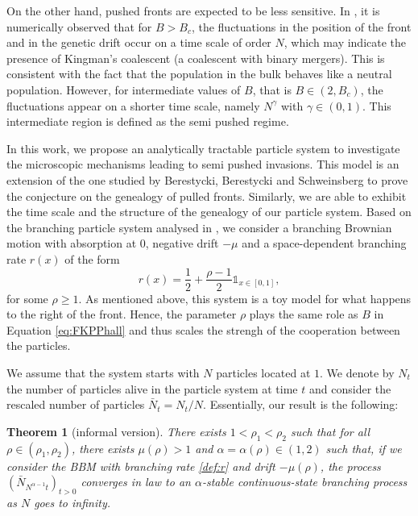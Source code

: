 \documentclass[11pt]{article}
\theoremstyle{plain}
\newtheorem{theorem}[lemma]{Theorem}
\begin{document}
  On the other hand, pushed fronts are expected to be less sensitive. In \cite{Birzu2018}, it is numerically observed that for $B>B_c$, the fluctuations in the position of the front and in the genetic drift occur on a time scale of order $N$, which may indicate the presence of Kingman's coalescent (a coalescent with binary mergers). This is consistent with the fact that the population in the bulk behaves like a neutral population. However, for intermediate values of $B$, that is $B\in(2,B_c)$, the fluctuations appear on a shorter time scale, namely $N^\gamma$ with $\gamma\in(0,1)$.  This intermediate region is defined as the semi pushed regime.

  
In this work, we propose an analytically tractable particle system to investigate the microscopic mechanisms leading to semi pushed invasions. This model is an extension of the one studied by Berestycki, Berestycki and Schweinsberg \cite{Berestycki2010} to prove the conjecture on the genealogy of pulled fronts. Similarly, we are able to exhibit the time scale and the structure of the genealogy of our particle system. Based on the branching particle system analysed in \cite{Berestycki2010}, we consider a branching Brownian motion with absorption at $0$, negative drift $-\mu$ and a space-dependent branching rate $r(x)$ of the form
\begin{equation}
\label{def:r}r(x)=\frac{1}{2}+\frac{\rho-1}{2}\mathbb{1}_{x\in[0,1]},
\end{equation}
for some $\rho\geqslant 1$. As mentioned above, this system is a toy model for what happens to the right of the front. Hence, the parameter $\rho$ plays the same role as $B$ in Equation \eqref{eq:FKPPhall} and thus scales the strengh of the cooperation between the particles. 

 We assume that the system starts with $N$ particles located at $1$. We denote by $N_t$ the number of particles alive in the particle system at time $t$ and consider the rescaled number of particles $\bar{N}_t=N_t/N$. 
Essentially, our result is the following: 
\begin{theorem}[informal version]\label{informal:version}
There exists $1<\rho_1<\rho_2$ such that for all $\rho\in(\rho_1,\rho_2)$, there exists $\mu(\rho)>1$ and $\alpha=\alpha(\rho)\in(1,2)$ such that, if we consider the BBM with branching rate \eqref{def:r} and drift $-\mu(\rho)$, the process $(\bar{N}_{N^{\alpha-1}t})_{t>0}$ converges in law to an $\alpha$-stable continuous-state branching process as $N$ goes to infinity.
\end{theorem}
\end{document}
